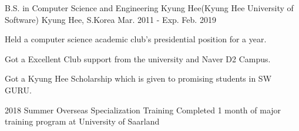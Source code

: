

\begin{cventries}

  \cventry
    {B.S. in Computer Science and Engineering} %
    {Kyung Hee(Kyung Hee University of Software)} %
    {Kyung Hee, S.Korea} %
    {Mar. 2011 - Exp. Feb. 2019} %
    {
      \begin{cvitems} %
        \item {Held a computer science academic club's presidential position for a year.}
        \item {Got a Excellent Club support from the university and Naver D2 Campus.}
        \item {Got a Kyung Hee Scholarship which is given to promising students in SW GURU.}
        \item {2018 Summer Overseas Specialization Training Completed 1 month of major training program at University of Saarland}
      \end{cvitems}
    }

\end{cventries}
